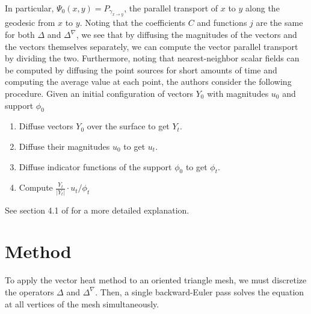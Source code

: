 \documentclass{article}
\begin{document}
In particular, $\Psi_{0}(x, y) = P_{\gamma_{{x \to y}}}$, the parallel transport of $x$ to $y$
along the geodesic from $x$ to $y$. Noting that the coefficients $C$ and
functions $j$ are the same for both $\Delta$ and $\Delta^{\nabla}$, we see that
by diffusing the magnitudes of the vectors and the vectors themselves
separately, we can compute the vector parallel transport by dividing the two.
Furthermore, noting that nearest-neighbor scalar fields can be computed by
diffusing the point sources for short amounts of time and computing the average
value at each point, the authors consider the
following procedure. Given an initial configuration of vectors $Y_{0}$ with
magnitudes $u_{0}$ and support $\phi_{0}$
\begin{enumerate}
  \item Diffuse vectors $Y_{0}$ over the surface to get $Y_{t}$.
  \item Diffuse their magnitudes $u_{0}$ to get $u_{t}$.
  \item Diffuse indicator functions of the support $\phi_{0}$ to get $\phi_{t}$.
  \item Compute $\frac{Y_{t}}{|Y_{t}|} \cdot u_{t}/\phi_{t}$
\end{enumerate}
See section 4.1 of \cite{Sharp:2019:VHM} for a more detailed explanation.

\section{Method}
To apply the vector heat method to an oriented triangle mesh, we must discretize the
operators $\Delta$ and $\Delta^{\nabla}$. Then, a single backward-Euler pass
solves the equation at all vertices of the mesh simultaneously.
\end{document}
